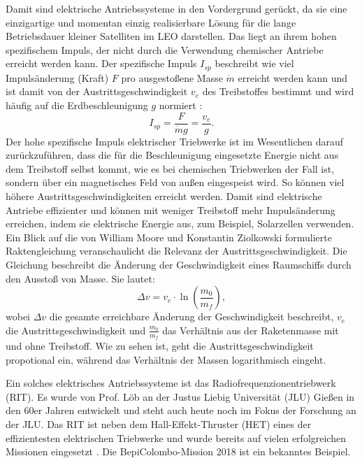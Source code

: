 Damit sind elektrische Antriebssysteme in den Vordergrund gerückt, da sie eine einzigartige und momentan einzig realisierbare Lösung für die lange Betriebsdauer kleiner Satelliten im LEO darstellen. Das liegt an ihrem hohen spezifischem Impuls, der nicht durch die Verwendung chemischer Antriebe erreicht werden kann. Der spezifische Impuls $I_{sp}$ beschreibt wie viel Impulsänderung (Kraft) $F$ pro ausgestoßene Masse $\dot{m}$ erreicht werden kann und ist damit von der Austrittsgeschwindigkeit $v_e$ des Treibstoffes bestimmt und wird häufig auf die Erdbeschleunigung $g$ normiert :
\begin{equation}
    I_{sp} = \frac{F}{\dot{m}g} = \frac{v_e}{g}.
\end{equation} 
Der hohe spezifische Impuls elektrischer Triebwerke ist im Wesentlichen darauf zurückzuführen, dass die für die Beschleunigung eingesetzte Energie nicht aus dem Treibstoff selbst kommt, wie es bei chemischen Triebwerken der Fall ist, sondern über ein magnetisches Feld von außen eingespeist wird. So können viel höhere Austrittsgeschwindigkeiten erreicht werden. Damit sind elektrische Antriebe effizienter und können mit weniger Treibstoff mehr Impulsänderung erreichen, indem sie elektrische Energie aus, zum Beispiel, Solarzellen verwenden. Ein Blick auf die von William Moore und Konstantin Ziolkowski formulierte Raktengleichung veranschaulicht die Relevanz der Austrittsgeschwindigkeit. Die Gleichung beschreibt die Änderung der Geschwindigkeit eines Raumschiffs durch den Ausstoß von Masse. Sie lautet:
\begin{equation}
    \Delta v = v_e \cdot \ln\left(\frac{m_0}{m_f}\right),
\end{equation}
wobei $\Delta v$ die gesamte erreichbare Änderung der Geschwindigkeit beschreibt, $v_e$ die Austrittsgeschwindigkeit und $\frac{m_0}{m_f}$ das Verhältnis aus der Raketenmasse mit und ohne Treibstoff. Wie zu sehen ist, geht die Austrittsgeschwindigkeit propotional ein, während das Verhältnis der Massen logarithmisch eingeht. 

Ein solches elektrisches Antriebssysteme ist das Radiofrequenzionentriebwerk (RIT). Es wurde von Prof. Löb an der Justus Liebig Universität (JLU) Gießen in den 60er Jahren entwickelt und steht auch heute noch im Fokus der Forschung an der JLU. Das RIT ist neben dem Hall-Effekt-Thruster (HET) eines der effizientesten elektrischen Triebwerke und wurde bereits auf vielen erfolgreichen Missionen eingesetzt \cite[S. 6]{ion}. Die BepiColombo-Mission 2018 ist ein bekanntes Beispiel.

